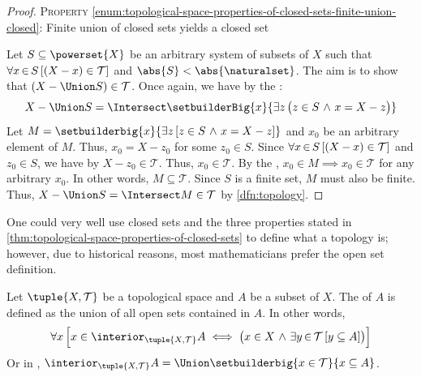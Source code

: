 \begin{proof}
    \vspace{0.3cm}
    \noindent
    {\scshape Property} \ref{enum:topological-space-properties-of-closed-sets-finite-union-closed}: Finite union of closed sets yields a closed set

    \vspace{0.1cm}
    \noindent
    Let \( S \subseteq \powerset{X} \) be an arbitrary system of subsets of \( X \)  such that
    \( \forall x\,{\in}\,S \, \mleft[ \mleft( X - x \mright) \in \mathcal{T} \mright] \) and \( \abs{S} < \abs{\naturalset} \).
    The aim is to show that \( (X - \Union S) \in \mathcal{T} \).
    Once again, we have by the :
    \begin{equation*}
        X - \Union S = \Intersect \setbuilderBig{x}{\exists z \, \big( z \in S \,\,{\land}\,\, x = X - z \big)}
    \end{equation*}
    Let \( M = \setbuilderbig{x}{\exists z \, \mleft[ z \in S \,\,{\land}\,\, x = X - z \mright]} \) and \( x_{0} \)
    be an arbitrary element of \( M \). Thus, \( x_{0} = X - z_{0} \) for some \( z_{0} \in S \).
    Since \( \forall x\,{\in}\,S \, \mleft[ \mleft( X - x \mright) \in \mathcal{T} \mright] \) and \( z_{0} \in S \),
    we have by  \( X - z_{0} \in \mathcal{T} \).
    Thus, \( x_{0} \in \mathcal{T} \). By the ,
    \( x_{0} \in M {\implies} x_{0} \in \mathcal{T} \) for any arbitrary \( x_{0} \).
    In other words, \( M \subseteq \mathcal{T} \). Since \( S \) is a finite set, \( M \) must also be finite. Thus,
    \( X - \Union S = \Intersect M \in \mathcal{T} \) by \cref{dfn:topology}.
\end{proof}

\begin{rem}
    One could very well use closed sets and the three properties stated in \cref{thm:topological-space-properties-of-closed-sets} to define what
    a topology is; however, due to historical reasons, most mathematicians prefer the open set definition.
\end{rem}

\begin{dfn}[Interior]
     \label{dfn:topological-space-interior-of-a-subset}
    Let \( \tuple{X, \mathcal{T}} \) be a topological space and \( A \) be a subset of \( X \). The  of \( A \) is defined as
    the union of all open sets contained in \( A \). In other words,
    \begin{equation*}
        \forall x \, \Big[ x \in \interior_{\tuple{X, \mathcal{T}}}{A} \iff \big( x \in X \,\,{\land}\,\,
        \exists y\,{\in}\,\mathcal{T} \, \mleft[ y \subseteq A \mright] \big) \Big]
    \end{equation*}
    Or in , \( \interior_{\tuple{X, \mathcal{T}}}{A} = \Union \setbuilderbig{x \in \mathcal{T}}{x \subseteq A} \).
\end{dfn}

